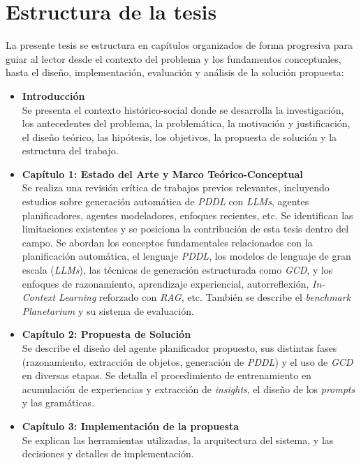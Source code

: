 \section*{Estructura de la tesis}

La presente tesis se estructura en capítulos organizados de forma progresiva para guiar al lector desde el contexto del problema y los fundamentos conceptuales, hasta el diseño, implementación, evaluación y análisis de la solución propuesta:

\begin{itemize}
    \item \textbf{Introducción} \\
    Se presenta el contexto histórico-social donde se desarrolla la investigación, los antecedentes del problema, la problemática, la motivación y justificación, el diseño teórico, las hipótesis, los objetivos, la propuesta de solución y la estructura del trabajo.

    \item \textbf{Capítulo 1: Estado del Arte y Marco Teórico-Conceptual} \\
    Se realiza una revisión crítica de trabajos previos relevantes, incluyendo estudios sobre generación automática de \textit{PDDL} con \textit{LLMs}, agentes planificadores, agentes modeladores, enfoques recientes, etc. Se identifican las limitaciones existentes y se posiciona la contribución de esta tesis dentro del campo. Se abordan los conceptos fundamentales relacionados con la planificación automática, el lenguaje \textit{PDDL}, los modelos de lenguaje de gran escala (\textit{LLMs}), las técnicas de generación estructurada como \textit{GCD}, y los enfoques de razonamiento, aprendizaje experiencial, autorreflexión, \textit{In-Context Learning} reforzado con \textit{RAG}, etc. También se describe el \textit{benchmark Planetarium} y su sistema de evaluación.
    
    \item \textbf{Capítulo 2: Propuesta de Solución} \\
    Se describe el diseño del agente planificador propuesto, sus distintas fases (razonamiento, extracción de objetos, generación de \textit{PDDL}) y el uso de \textit{GCD} en diversas etapas. Se detalla el procedimiento de entrenamiento en acumulación de experiencias y extracción de \textit{insights}, el diseño de los \textit{prompts} y las gramáticas.
    
    \item \textbf{Capítulo 3: Implementación de la propuesta} \\
    Se explican las herramientas utilizadas, la arquitectura del sistema, y las decisiones y detalles de implementación.
    

\end{itemize}
